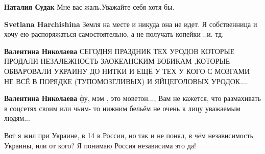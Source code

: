 \begin{itemize}
\begin{itemize}
 
\textbf{Наталия Судак} Мне вас жаль.Уважайте себя хотя бы.

 
\textbf{Svetlana Harchishina} Земля на месте и никуда она не идет. Я собственница и хочу ею распоряжаться самостоятельно, а не получать копейки ..и. тд.

 
\textbf{Валентина Николаева} СЕГОДНЯ ПРАЗДНИК ТЕХ УРОДОВ КОТОРЫЕ ПРОДАЛИ НЕЗАЛЕЖНОСТЬ ЗАОКЕАНСКИМ БОБИКАМ ,КОТОРЫЕ ОБВАРОВАЛИ УКРАИНУ ДО НИТКИ И ЕЩЁ У ТЕХ У КОГО С МОЗГАМИ НЕ ВСЁ В ПОРЯДКЕ (ТУПОМОЗГЛИВЫХ) И ЯЙЦЕГОЛОВЫХ УРОДОК....

 
\textbf{Валентина Николаева} фу, мэм , это моветон..., Вам не кажется, что размахивать в соцсетях своим или чьим- то нижним бельём не очень к лицу уважаемым людям...

 
Вот я жил при Украине, в 14 в России, но так и не понял, в чëм независимость Украины, или от кого? Я понимаю Россия независима это да!

 

\end{itemize}
\end{itemize}
